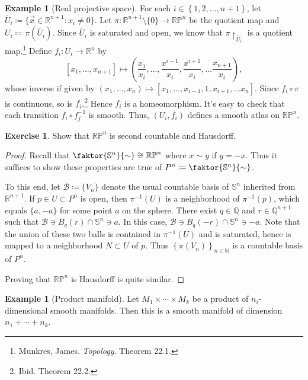 \documentclass[10pt,letterpaper,cm]{nupset}
\theoremstyle{definition}
\newtheorem{exmp}[definition]{Example}
\theoremstyle{theorem}
\newtheorem{exercise}[definition]{Exercise}
\theoremstyle{remark}
\newcommand{\N}{\mathbb N}
\newcommand{\Q}{\mathbb Q}
\newcommand{\R}{\mathbb R}
\newcommand{\RP}{\mathbb{RP}}
\renewcommand{\S}{\mathbb S}
\newcommand{\1}{\mathbf{1}}
\newcommand{\x}{\vec x}
\newcommand{\0}{\vec 0}
\begin{document}
\begin{exmp}[Real projective space]
 For each $i \in \left\{1, 2, \ldots, n+1\right\}$, let $\tilde{U_i}\coloneqq  \{\x \in \R^{n+1} : x_i \ne 0\}$. Let $\pi: \R^{n+1} \setminus\{0\} \to \RP^n$ be the quotient map and $U_i \coloneqq  \pi\left(\tilde{U_i}\right)$. Since $\tilde{U_i}$ is saturated and open, we know that $\pi \restriction_{\tilde{U_i}}$ is a quotient map.\footnote{Munkres, James. \textit{Topology}. Theorem 22.1.} Define $f_i : U_i \to \R^n$ by $$\left[x_1, \ldots, x_{n+1}\right] \mapsto \left(\frac{x_1}{x_i}, \ldots, \frac{x^{i-1}}{x_i}, \frac{x^{i+1}}{x_i}, \ldots \frac{x_{n+1}}{x_i}\right),$$ whose inverse if given by $\left(x_1, \ldots, x_n\right) \mapsto \left[x_1, \ldots, x_{i-1}, 1, x_{i+1}, \ldots x_n\right]$. Since $f_i \circ \pi$ is continuous, so is $f_i$.\footnote{Ibid. Theorem 22.2.} Hence $f_i$ is a homeomorphism. It's easy to check that each transition $f_i \circ f_j^{-1}$ is smooth. Thus, $(U_i, f_i)$ defines a smooth atlas on $\RP^n$.
\end{exmp}

\begin{exercise} 
Show that $\RP^n$ is second countable and Hausdorff. 
\end{exercise}
\begin{proof}
Recall that $\faktor{\S^n}{\sim} \cong \RP^n$ where $x \sim y$ if $y = {-x}$. Thus it suffices to show these properties are true of $P^n\coloneqq  \faktor{\S^n}{\sim}$. 

\smallskip


To this end, let $\mathcal{B}\coloneqq \{V_n\}$ denote the usual countable basis of $\S^n$ inherited from $\R^{n+1}$. If $p\in U\subset P^n$ is open, then $\pi^{-1}(U)$ is a neighborhood of $\pi^{-1}(p)$, which equals $\{a, -a\}$ for some point $a$ on the sphere.  There exist $q\in \Q$ and $r \in \Q^{n+1}$ such that $\mathcal{B} \ni B_q(r) \cap \S^n \ni a$. In this case, $\mathcal{B} \ni B_q({-r}) \cap \S^n \ni -a$. Note that the union of these two balls is contained in $\pi^{-1}(U)$ and is saturated, hence is mapped to a neighborhood $N \subset U$ of $p$. Thus $\left\{\pi(V_n)\right\}_{n\in \N}$  is a countable basis of $P^n$.

\smallskip

 Proving that $\RP^n$ is Hausdorff is quite similar.
\end{proof}

\begin{exmp}[Product manifold]

Let $M_1 \times \cdots \times M_k$ be a product of $n_i$-dimensional smooth manifolds. Then this is a smooth manifold of dimension $n_1 + \cdots + n_k$.

\end{exmp}
\end{document}
